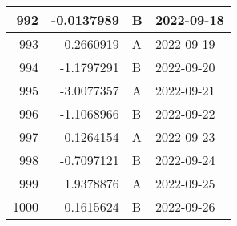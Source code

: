\begin{tabular}{r|r|l|l}
\hline
992 & -0.0137989 & B & 2022-09-18\\
\hline
993 & -0.2660919 & A & 2022-09-19\\
\hline
994 & -1.1797291 & B & 2022-09-20\\
\hline
995 & -3.0077357 & A & 2022-09-21\\
\hline
996 & -1.1068966 & B & 2022-09-22\\
\hline
997 & -0.1264154 & A & 2022-09-23\\
\hline
998 & -0.7097121 & B & 2022-09-24\\
\hline
999 & 1.9378876 & A & 2022-09-25\\
\hline
1000 & 0.1615624 & B & 2022-09-26\\
\hline
\end{tabular}
